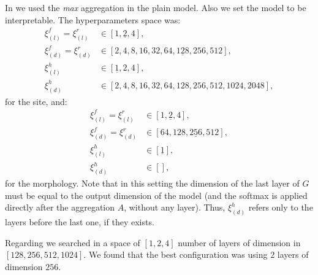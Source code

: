 In \maxi{} we used the \emph{max} aggregation in the plain
model. Also we set the model to be interpretable. The hyperparameters
space was: 
\begin{align*}
  \xi_{(l)}^f=\xi_{(l)}^r&\in[1,\underline{2},4],\\
  \xi_{(d)}^f=\xi_{(d)}^r&\in[2,4,8,16,32,64,\underline{128},256,512],\\
  \xi_{(l)}^h&\in[\underline{1},2,4],\\
  \xi_{(d)}^h&\in[2,4,8,16,32,64,128,256,512,1024,2048],
\end{align*}
for the site, and:
\begin{align*}
  \xi_{(l)}^f=\xi_{(l)}^r&\in[1,\underline{2},4],\\
  \xi_{(d)}^f=\xi_{(d)}^r&\in[64,128,\underline{256},512],\\
  \xi_{(l)}^h&\in[\underline{1}],\\
  \xi_{(d)}^h&\in[],
\end{align*}
for the morphology. Note that in this setting the dimension of the
last layer of $G$ must be equal to the output dimension of the model
(and the softmax is applied directly after the aggregation $A$,
without any layer). Thus, $\xi_{(d)}^h$ refers only to the
layers before the last one, if they exists.

Regarding \gru{} we searched in a space of $[1,2,4]$ number of layers of
dimension in $[128,256,512,1024]$. We found that the best
configuration was using $2$ layers of dimension $256$.





